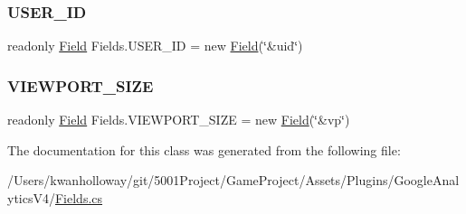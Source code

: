 \subsubsection{\texorpdfstring{U\+S\+E\+R\+\_\+\+ID}{USER\_ID}}
{\footnotesize\ttfamily readonly \hyperlink{class_field}{Field} Fields.\+U\+S\+E\+R\+\_\+\+ID = new \hyperlink{class_field}{Field}(\char`\"{}\&uid\char`\"{})\hspace{0.3cm}{\ttfamily [static]}}

\mbox{\label{class_fields_a7e3fe01e18ccd75ae06679a6cd8943d2}} 
\subsubsection{\texorpdfstring{V\+I\+E\+W\+P\+O\+R\+T\+\_\+\+S\+I\+ZE}{VIEWPORT\_SIZE}}
{\footnotesize\ttfamily readonly \hyperlink{class_field}{Field} Fields.\+V\+I\+E\+W\+P\+O\+R\+T\+\_\+\+S\+I\+ZE = new \hyperlink{class_field}{Field}(\char`\"{}\&vp\char`\"{})\hspace{0.3cm}{\ttfamily [static]}}



The documentation for this class was generated from the following file\+:\begin{DoxyCompactItemize}
\item 
/\+Users/kwanholloway/git/5001\+Project/\+Game\+Project/\+Assets/\+Plugins/\+Google\+Analytics\+V4/\hyperlink{_fields_8cs}{Fields.\+cs}\end{DoxyCompactItemize}
